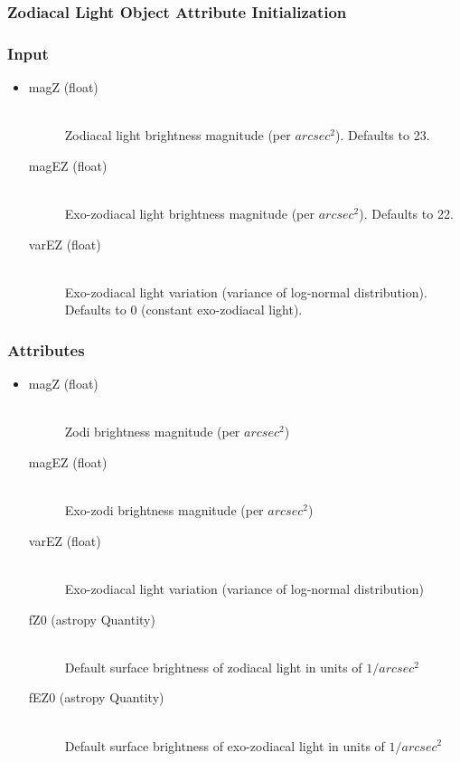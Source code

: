 \documentclass[cleanfoot]{asme2ej}
\begin{document}
\subsubsection{Zodiacal Light Object Attribute Initialization}

\subsubsection*{Input}
\begin{itemize}
\item
\begin{description}
    \item[magZ (float)] \hfill \\ Zodiacal light brightness magnitude (per $ arcsec^2 $). Defaults to 23.
    \item[magEZ (float)] \hfill \\ Exo-zodiacal light brightness magnitude (per $ arcsec^2 $). Defaults to 22.
    \item[varEZ (float)] \hfill \\ Exo-zodiacal light variation (variance of log-normal distribution). Defaults to 0 (constant exo-zodiacal light).
\end{description}
\end{itemize}

\subsubsection*{Attributes}
\begin{itemize}
\item
\begin{description}
    \item[magZ (float)] \hfill \\ Zodi brightness magnitude (per $ arcsec^2 $)
    \item[magEZ (float)] \hfill \\ Exo-zodi brightness magnitude (per $ arcsec^2 $)
    \item[varEZ (float)] \hfill \\ Exo-zodiacal light variation (variance of log-normal distribution)
    \item[fZ0 (astropy Quantity)] \hfill \\ Default surface brightness of zodiacal light in units of $ 1/arcsec^2 $ 
    \item[fEZ0 (astropy Quantity)] \hfill \\ Default surface brightness of exo-zodiacal light in units of $ 1/arcsec^2 $ 
\end{description}
\end{itemize}
\end{document}
